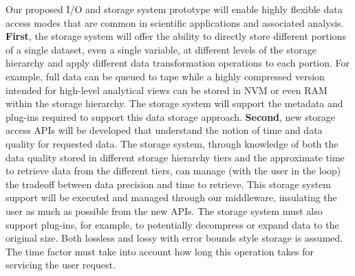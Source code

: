 \documentclass[11pt,letterpaper]{article}
\newcommand{\hasan}[1]{{\it \color{darkgreen} #1 -Hasan }}
\newcommand{\hasan}[1]{}
\begin{document}


Our proposed I/O and storage system prototype will enable
highly flexible data access modes that are common in scientific applications
and associated analysis.
%
%
\textbf{First}, the storage system will offer the ability to directly store
different portions of a single dataset, even a single variable, at different
levels of the storage hierarchy and apply different data transformation
operations to each portion. For example, full data can be queued to tape while
a highly compressed version intended for high-level analytical views can be
stored in NVM or even RAM within the storage hierarchy. The storage system will
support the metadata and plug-ins required to support this data storage
approach.
%
\textbf{Second}, new storage access APIs will be developed that understand the
notion of time and data quality for requested data. The storage system,
through knowledge of both the data quality stored in different storage
hierarchy tiers and the approximate time to retrieve data from the different
tiers, can manage (with the user in the loop) the tradeoff between data precision and time to
retrieve. This storage system support will be executed and managed through our middleware, 
insulating the user as much as possible from the new APIs. The storage system
must also support plug-ins, for example, to potentially decompress or expand data to the
original size. Both lossless and lossy with error bounds style storage is
assumed. The time factor must take into account how long this operation takes
for servicing the user request.
\end{document}
